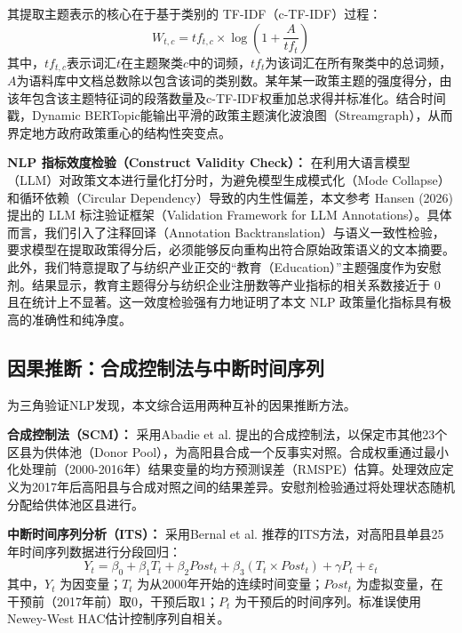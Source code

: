 \documentclass[12pt,a4paper]{ctexart}
\begin{document}
其提取主题表示的核心在于基于类别的 TF-IDF（c-TF-IDF）过程：
\begin{equation}
    W_{t,c} = tf_{t,c} \times \log\left(1 + \frac{A}{tf_t}\right)
\end{equation}
其中，$tf_{t,c}$表示词汇$t$在主题聚类$c$中的词频，$tf_t$为该词汇在所有聚类中的总词频，$A$为语料库中文档总数除以包含该词的类别数。某年某一政策主题的强度得分，由该年包含该主题特征词的段落数量及c-TF-IDF权重加总求得并标准化。结合时间戳，Dynamic BERTopic能输出平滑的政策主题演化波浪图（Streamgraph），从而界定地方政府政策重心的结构性突变点。

\textbf{NLP 指标效度检验（Construct Validity Check）：} 在利用大语言模型（LLM）对政策文本进行量化打分时，为避免模型生成模式化（Mode Collapse）和循环依赖（Circular Dependency）导致的内生性偏差，本文参考 Hansen (2026) 提出的 LLM 标注验证框架（Validation Framework for LLM Annotations）\cite{Hansen2026}。具体而言，我们引入了注释回译（Annotation Backtranslation）与语义一致性检验，要求模型在提取政策得分后，必须能够反向重构出符合原始政策语义的文本摘要。此外，我们特意提取了与纺织产业正交的“教育（Education）”主题强度作为安慰剂。结果显示，教育主题得分与纺织企业注册数等产业指标的相关系数接近于 0 且在统计上不显著。这一效度检验强有力地证明了本文 NLP 政策量化指标具有极高的准确性和纯净度。

\subsection{因果推断：合成控制法与中断时间序列}
\label{sec:causal}
为三角验证NLP发现，本文综合运用两种互补的因果推断方法。

\textbf{合成控制法（SCM）：} 采用Abadie et al. \cite{Abadie2010}提出的合成控制法，以保定市其他23个区县为供体池（Donor Pool），为高阳县合成一个反事实对照。合成权重通过最小化处理前（2000-2016年）结果变量的均方预测误差（RMSPE）估算。处理效应定义为2017年后高阳县与合成对照之间的结果差异。安慰剂检验通过将处理状态随机分配给供体池区县进行。

\textbf{中断时间序列分析（ITS）：} 采用Bernal et al. \cite{Bernal2017}推荐的ITS方法，对高阳县单县25年时间序列数据进行分段回归：
\begin{equation}
    Y_t = \beta_0 + \beta_1 T_t + \beta_2 Post_t + \beta_3 (T_t \times Post_t) + \gamma P_t + \varepsilon_t
\end{equation}
其中，$Y_t$ 为因变量；$T_t$ 为从2000年开始的连续时间变量；$Post_t$ 为虚拟变量，在干预前（2017年前）取0，干预后取1；$P_t$ 为干预后的时间序列。标准误使用Newey-West HAC估计控制序列自相关。
\end{document}
